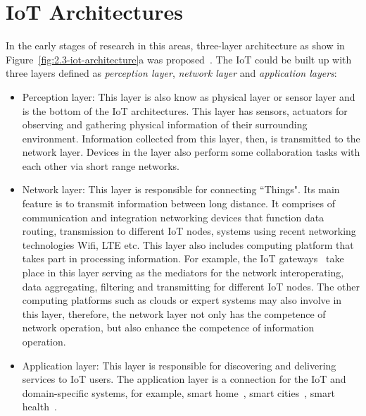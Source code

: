 \section{IoT Architectures}
\label{sec:architecture_of_iot}


In the early stages of research in this areas, three-layer architecture as show in Figure~\ref{fig:2.3-iot-architecture}a was proposed~\citep{Wu:2010,Yang:2011}. 
The IoT could be built up with three layers defined as \textit{perception layer}, \textit{network layer} and \textit{application layers}:

\begin{itemize}[noitemsep,nolistsep]
\item Perception layer: 
This layer is also know as physical layer or sensor layer and is the bottom of the IoT architectures. 
This layer has sensors, actuators for observing and gathering physical information of their surrounding environment.
Information collected from this layer, then, is transmitted to the network layer.
Devices in the layer also perform some collaboration tasks with each other via short range networks.

\item Network layer: 
This layer is responsible for connecting ``Things". 
Its main feature is to transmit information between long distance. 
It comprises of communication and integration networking devices that function data routing, transmission to different IoT nodes, systems using recent networking technologies Wifi, LTE etc.
This layer also includes computing platform that takes part in processing information.
For example, the IoT gateways~\citep{Guoqiang:2013} take place in this layer serving as the mediators for the network interoperating, data aggregating, filtering and transmitting for different IoT nodes.
The other computing platforms such as clouds or expert systems may also involve in this layer, 
therefore, the network layer not only has the competence of network operation, but also enhance the competence of information operation.

\item Application layer:
This layer is responsible for discovering and delivering services to IoT users.
The application layer is a connection for the IoT and domain-specific systems, for example, smart home~\citep{Biljana:2017}, smart cities~\citep{Gaur:2015}, smart health~\citep{Catarinucci:2015}.
\end{itemize}


